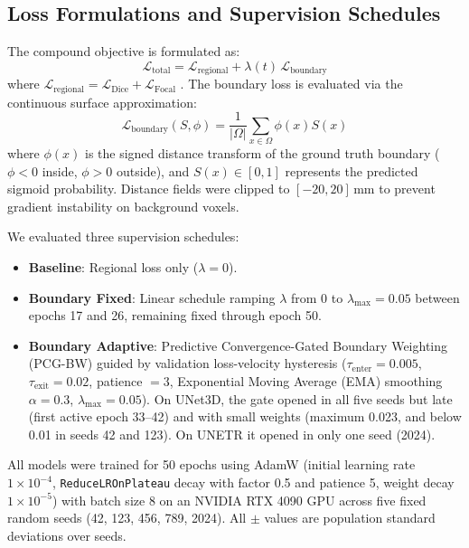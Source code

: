 \documentclass[10pt, a4paper, twocolumn]{article}
\begin{document}
\subsection{Loss Formulations and Supervision Schedules}
The compound objective is formulated as:
\begin{equation}
\mathcal{L}_{\text{total}} = \mathcal{L}_{\text{regional}} + \lambda(t)\,\mathcal{L}_{\text{boundary}}
\end{equation}
where $\mathcal{L}_{\text{regional}} = \mathcal{L}_{\text{Dice}} + \mathcal{L}_{\text{Focal}}$ \cite{lin2017focal, ma2021loss}. The boundary loss is evaluated via the continuous surface approximation:
\begin{equation}
\mathcal{L}_{\text{boundary}}(S, \phi) = \frac{1}{|\Omega|} \sum_{x \in \Omega} \phi(x) S(x)
\end{equation}
where $\phi(x)$ is the signed distance transform of the ground truth boundary ($\phi < 0$ inside, $\phi > 0$ outside), and $S(x) \in [0,1]$ represents the predicted sigmoid probability. Distance fields were clipped to $[-20, 20]$\,mm to prevent gradient instability on background voxels.

We evaluated three supervision schedules:
\begin{itemize}
    \item \textbf{Baseline}: Regional loss only ($\lambda = 0$).
    \item \textbf{Boundary Fixed}: Linear schedule ramping $\lambda$ from 0 to $\lambda_{\max} = 0.05$ between epochs 17 and 26, remaining fixed through epoch 50.
    \item \textbf{Boundary Adaptive}: Predictive Convergence-Gated Boundary Weighting (PCG-BW) guided by validation loss-velocity hysteresis ($\tau_{\text{enter}} = 0.005$, $\tau_{\text{exit}} = 0.02$, patience $= 3$, Exponential Moving Average (EMA) smoothing $\alpha = 0.3$, $\lambda_{\max}=0.05$). On UNet3D, the gate opened in all five seeds but late (first active epoch 33--42) and with small weights (maximum 0.023, and below 0.01 in seeds 42 and 123). On UNETR it opened in only one seed (2024).
\end{itemize}

All models were trained for 50 epochs using AdamW (initial learning rate $1\times10^{-4}$, \texttt{ReduceLROnPlateau} decay with factor 0.5 and patience 5, weight decay $1\times10^{-5}$) with batch size 8 on an NVIDIA RTX 4090 GPU across five fixed random seeds (42, 123, 456, 789, 2024). All $\pm$ values are population standard deviations over seeds.
\end{document}
